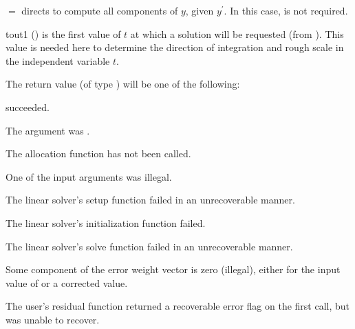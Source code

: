 {{\begin{args}
    $ = $ directs  to compute all  
    components of $y$, given $y^\prime$.  In this case,  is not required.

  \item[tout1] ()
    is the first value of $t$ at which a solution will be requested (from
    ).  This value is needed here to determine the direction of
    integration and rough scale in the independent variable $t$.   

  \end{args}
}
{
  The return value  (of type ) will be one of the following:

  \begin{args}

  \item[\Id{IDA\_SUCCESS}]
     succeeded.

  \item[\Id{IDA\_MEM\_NULL}]
    The argument  was .             
               
  \item[\Id{IDA\_NO\_MALLOC}]
    The allocation function  has not been called.
                                                  
  \item[\Id{IDA\_ILL\_INPUT}]
    One of the input arguments was illegal.    
                                                                 
  \item[\Id{IDA\_LSETUP\_FAIL}] 
    The linear solver's setup function failed in an unrecoverable manner.

  \item[\Id{IDA\_LINIT\_FAIL}]
    The linear solver's initialization function failed.   
                                                                 
  \item[\Id{IDA\_LSOLVE\_FAIL}] 
    The linear solver's solve function failed in an unrecoverable manner.

  \item[\Id{IDA\_BAD\_EWT}]
    Some component of the error weight vector is zero (illegal), either for 
    the input value of  or a corrected value.          
                                                                 
  \item[\Id{IDA\_FIRST\_RES\_FAIL}]
    The user's residual function returned a recoverable error flag on the first
    call, but  was unable to recover.       
                                                                 

\end{args}}}
